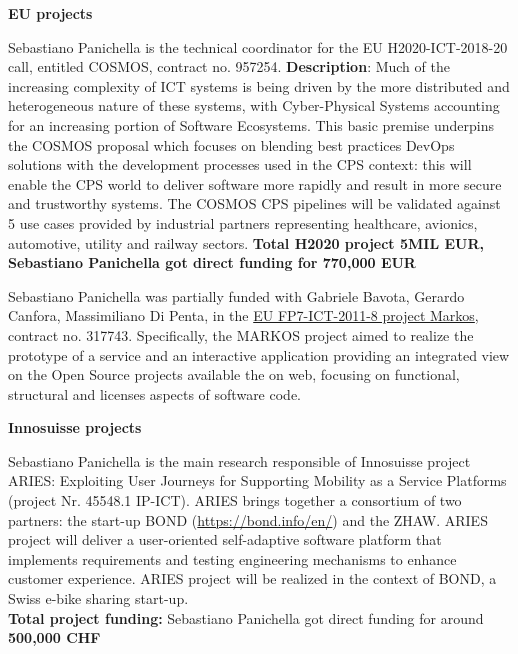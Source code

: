 \documentclass[10pt]{article}
\newcommand{\ins}[1]{\textcolor{blue}{\uline{#1}}} %
\newcommand{\ins}[1]{#1} %
\newcommand\on[1]{\nbc{ON}{#1}{red}} %
\begin{document}
\textbf{EU projects}
\begin{innerlist}
\item Sebastiano Panichella is the technical coordinator for the EU H2020-ICT-2018-20 call, entitled COSMOS, contract no. 957254. \textbf{Description}: Much of the increasing complexity of ICT systems is being driven by the more distributed and heterogeneous nature of these systems, with Cyber-Physical Systems accounting for an increasing portion of Software Ecosystems. This basic premise underpins the COSMOS proposal which focuses on blending best practices DevOps solutions with the development processes used in the CPS context: this will enable the CPS world to deliver software more rapidly and result in more secure and trustworthy systems. 
The COSMOS CPS pipelines will be validated against 5 use cases provided by industrial partners representing healthcare, avionics, automotive, utility and railway sectors.  
\textbf{Total H2020 project 5MIL EUR, Sebastiano Panichella got direct funding for 770,000 EUR} 
   \item Sebastiano Panichella was 
    partially funded with Gabriele Bavota, Gerardo Canfora, Massimiliano Di Penta, in the \href{��http://www.markosproject.eu/��}
                   {EU FP7-ICT-2011-8 project Markos}, contract no. 317743. Specifically, the MARKOS project aimed to realize the prototype of a service and an interactive application providing an integrated view on the Open Source projects available the on web, focusing on functional, structural and licenses aspects of software code. 
\end{innerlist}
\textbf{Innosuisse projects}
\begin{innerlist}
   \item Sebastiano Panichella is the main research responsible of Innosuisse project ARIES: Exploiting User Journeys for Supporting Mobility as a Service Platforms (project Nr. 45548.1 IP-ICT).
ARIES brings together a consortium of two partners: the start-up BOND (\href{https://bond.info/en/}{https://bond.info/en/}) and the ZHAW.
ARIES project will deliver a user-oriented self-adaptive software platform that implements requirements and testing engineering mechanisms to enhance customer experience. ARIES project will be realized in the context of BOND, a Swiss e-bike sharing start-up.\\
\textbf{Total project funding:} Sebastiano Panichella got direct funding for around \textbf{500,000 CHF}\\
\end{innerlist}
\end{document}
